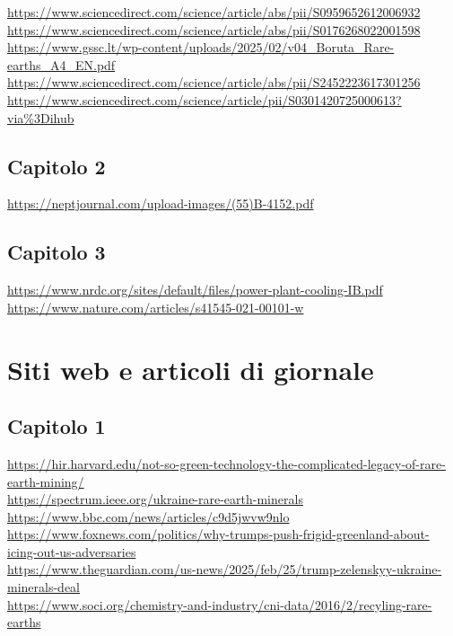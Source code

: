 \documentclass[12pt,a4paper,oneside]{book}
\begin{document}
\url{https://www.sciencedirect.com/science/article/abs/pii/S0959652612006932} \\
\url{https://www.sciencedirect.com/science/article/abs/pii/S0176268022001598} \\
\url{https://www.gssc.lt/wp-content/uploads/2025/02/v04_Boruta_Rare-earths_A4_EN.pdf} \\
\url{https://www.sciencedirect.com/science/article/abs/pii/S2452223617301256} \\
\url{https://www.sciencedirect.com/science/article/pii/S0301420725000613?via%3Dihub}

\subsection*{Capitolo 2}
\url{https://neptjournal.com/upload-images/(55)B-4152.pdf}

\subsection*{Capitolo 3}
\url{https://www.nrdc.org/sites/default/files/power-plant-cooling-IB.pdf}\\
\url{https://www.nature.com/articles/s41545-021-00101-w}

\section*{Siti web e articoli di giornale}
\subsection*{Capitolo 1}
\url{https://hir.harvard.edu/not-so-green-technology-the-complicated-legacy-of-rare-earth-mining/} \\
\url{https://spectrum.ieee.org/ukraine-rare-earth-minerals} \\
\url{https://www.bbc.com/news/articles/c9d5jwvw9nlo} \\
\url{https://www.foxnews.com/politics/why-trumps-push-frigid-greenland-about-icing-out-us-adversaries} \\
\url{https://www.theguardian.com/us-news/2025/feb/25/trump-zelenskyy-ukraine-minerals-deal} \\
\url{https://www.soci.org/chemistry-and-industry/cni-data/2016/2/recyling-rare-earths}
\end{document}
